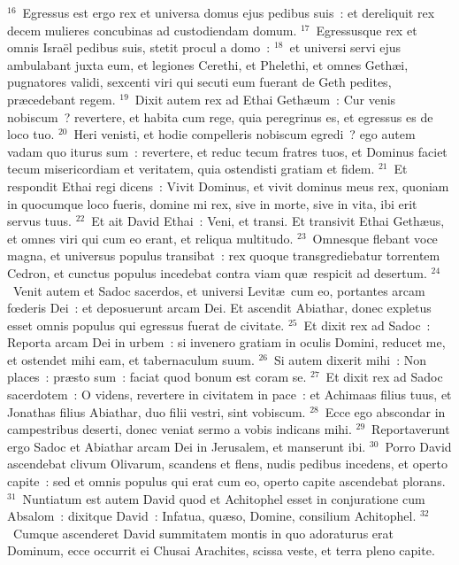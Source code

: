 ${}^{16}$~Egressus est ergo rex et universa domus ejus pedibus suis~: et dereliquit rex decem mulieres concubinas ad custodiendam domum.
${}^{17}$~Egressusque rex et omnis Isra\"el pedibus suis, stetit procul a domo~:
${}^{18}$~et universi servi ejus ambulabant juxta eum, et legiones Cerethi, et Phelethi, et omnes Geth\ae i, pugnatores validi, sexcenti viri qui secuti eum fuerant de Geth pedites, pr\ae cedebant regem.
${}^{19}$~Dixit autem rex ad Ethai Geth\ae um~: Cur venis nobiscum~? revertere, et habita cum rege, quia peregrinus es, et egressus es de loco tuo.
${}^{20}$~Heri venisti, et hodie compelleris nobiscum egredi~? ego autem vadam quo iturus sum~: revertere, et reduc tecum fratres tuos, et Dominus faciet tecum misericordiam et veritatem, quia ostendisti gratiam et fidem.
${}^{21}$~Et respondit Ethai regi dicens~: Vivit Dominus, et vivit dominus meus rex, quoniam in quocumque loco fueris, domine mi rex, sive in morte, sive in vita, ibi erit servus tuus.
${}^{22}$~Et ait David Ethai~: Veni, et transi. Et transivit Ethai Geth\ae us, et omnes viri qui cum eo erant, et reliqua multitudo.
${}^{23}$~Omnesque flebant voce magna, et universus populus transibat~: rex quoque transgrediebatur torrentem Cedron, et cunctus populus incedebat contra viam qu\ae\ respicit ad desertum.
${}^{24}$~Venit autem et Sadoc sacerdos, et universi Levit\ae\ cum eo, portantes arcam fœderis Dei~: et deposuerunt arcam Dei. Et ascendit Abiathar, donec expletus esset omnis populus qui egressus fuerat de civitate.
${}^{25}$~Et dixit rex ad Sadoc~: Reporta arcam Dei in urbem~: si invenero gratiam in oculis Domini, reducet me, et ostendet mihi eam, et tabernaculum suum.
${}^{26}$~Si autem dixerit mihi~: Non places~: pr\ae sto sum~: faciat quod bonum est coram se.
${}^{27}$~Et dixit rex ad Sadoc sacerdotem~: O videns, revertere in civitatem in pace~: et Achimaas filius tuus, et Jonathas filius Abiathar, duo filii vestri, sint vobiscum.
${}^{28}$~Ecce ego abscondar in campestribus deserti, donec veniat sermo a vobis indicans mihi.
${}^{29}$~Reportaverunt ergo Sadoc et Abiathar arcam Dei in Jerusalem, et manserunt ibi.
${}^{30}$~Porro David ascendebat clivum Olivarum, scandens et flens, nudis pedibus incedens, et operto capite~: sed et omnis populus qui erat cum eo, operto capite ascendebat plorans.
${}^{31}$~Nuntiatum est autem David quod et Achitophel esset in conjuratione cum Absalom~: dixitque David~: Infatua, qu\ae so, Domine, consilium Achitophel.
${}^{32}$~Cumque ascenderet David summitatem montis in quo adoraturus erat Dominum, ecce occurrit ei Chusai Arachites, scissa veste, et terra pleno capite.
